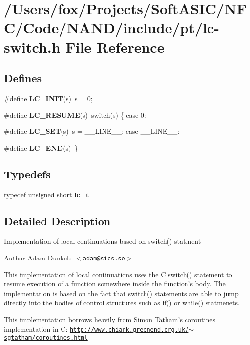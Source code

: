 \hypertarget{lc-switch_8h}{
\section{/Users/fox/Projects/SoftASIC/NFC/Code/NAND/include/pt/lc-\/switch.h File Reference}
\label{lc-switch_8h}
}
\subsection*{Defines}
\begin{DoxyCompactItemize}
\item 
\hypertarget{group__lc_ga2c1bb4fa6d7a6ff951a41c73fc721109}{
\#define {\bfseries LC\_\-INIT}(s)~s = 0;}
\label{group__lc_ga2c1bb4fa6d7a6ff951a41c73fc721109}

\item 
\hypertarget{group__lc_ga1ec8b8f4710dce1fa7fb87d3a31541ae}{
\#define {\bfseries LC\_\-RESUME}(s)~switch(s) \{ case 0:}
\label{group__lc_ga1ec8b8f4710dce1fa7fb87d3a31541ae}

\item 
\hypertarget{group__lc_gad8eec328a4868d767f0c00c8d1c6cfc1}{
\#define {\bfseries LC\_\-SET}(s)~s = \_\-\_\-LINE\_\-\_\-; case \_\-\_\-LINE\_\-\_\-:}
\label{group__lc_gad8eec328a4868d767f0c00c8d1c6cfc1}

\item 
\hypertarget{group__lc_gaca51ceb2f5d855dfde55bcedf8d3b92d}{
\#define {\bfseries LC\_\-END}(s)~\}}
\label{group__lc_gaca51ceb2f5d855dfde55bcedf8d3b92d}

\end{DoxyCompactItemize}
\subsection*{Typedefs}
\begin{DoxyCompactItemize}
\item 
\hypertarget{group__lc_ga3983e0c026396d5c4506779d770007ba}{
typedef unsigned short {\bfseries lc\_\-t}}
\label{group__lc_ga3983e0c026396d5c4506779d770007ba}

\end{DoxyCompactItemize}


\subsection{Detailed Description}
Implementation of local continuations based on switch() statment \begin{DoxyAuthor}{Author}
Adam Dunkels $<$\href{mailto:adam@sics.se}{\tt adam@sics.se}$>$
\end{DoxyAuthor}
This implementation of local continuations uses the C switch() statement to resume execution of a function somewhere inside the function's body. The implementation is based on the fact that switch() statements are able to jump directly into the bodies of control structures such as if() or while() statmenets.

This implementation borrows heavily from Simon Tatham's coroutines implementation in C: \href{http://www.chiark.greenend.org.uk/~sgtatham/coroutines.html}{\tt http://www.chiark.greenend.org.uk/$\sim$sgtatham/coroutines.html} 